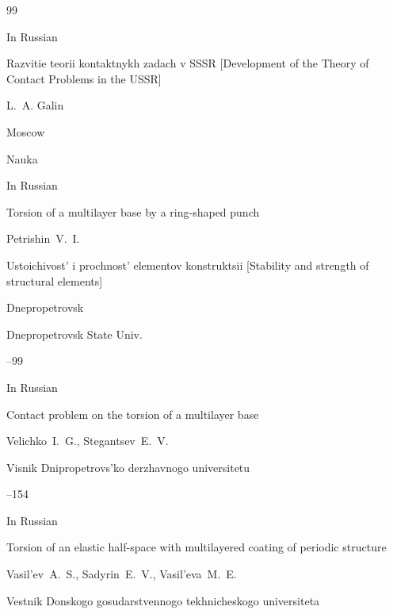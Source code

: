 \begin{thebibliography}{99}

\lang In Russian 

\book  Razvitie teorii kontaktnykh zadach v SSSR \rm [Development of the Theory of Contact Problems in the USSR]

\eds L.~A. Galin

\publaddr Moscow

\publ Nauka










\lang In Russian

\paper Torsion of a multilayer base by a ring-shaped punch

\by Petrishin~V.~I.

\inbook Ustoichivost' i prochnost' elementov konstruktsii \rm [Stability and strength of structural elements]

\publaddr Dnepropetrovsk 

\publ Dnepropetrovsk State Univ.


--99








\lang In Russian

\paper Contact problem on the  torsion of a multilayer base

\by Velichko~I.~G., Stegantsev~E.~V.

\jour Visnik Dnipropetrovs'ko derzhavnogo universitetu



--154






\lang In Russian

\paper Torsion of an elastic half-space with multilayered coating of periodic structure

\by Vasil'ev~A.~S., Sadyrin~E.~V., Vasil'eva~M.~E. 

\jour Vestnik Donskogo gosudarstvennogo tekhnicheskogo universiteta 


\end{thebibliography}
